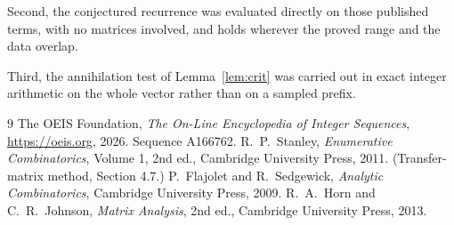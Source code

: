 \documentclass[11pt,a4paper]{article}
\theoremstyle{plain}
\theoremstyle{definition}
\begin{document}
Second, the conjectured recurrence was evaluated directly on those published terms, with no
matrices involved, and holds wherever the proved range and the data overlap.

Third, the annihilation test of Lemma~\ref{lem:crit} was carried out in exact integer
arithmetic on the whole vector rather than on a sampled prefix.

\begin{thebibliography}{9}
 The OEIS Foundation, \emph{The On-Line Encyclopedia of Integer
Sequences}, \url{https://oeis.org}, 2026. Sequence A166762.
 R.~P.~Stanley, \emph{Enumerative Combinatorics}, Volume 1, 2nd ed.,
Cambridge University Press, 2011. (Transfer-matrix method, Section 4.7.)
 P.~Flajolet and R.~Sedgewick, \emph{Analytic Combinatorics}, Cambridge
University Press, 2009.
 R.~A.~Horn and C.~R.~Johnson, \emph{Matrix Analysis}, 2nd ed., Cambridge
University Press, 2013.
\end{thebibliography}
\end{document}
